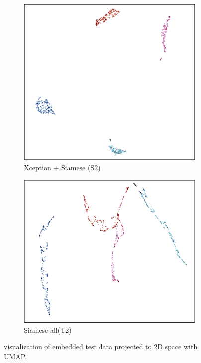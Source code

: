 \begin{figure}[h]
  \centering
  \begin{subfigure}[b]{0.48\linewidth}
   \includegraphics[width=0.9\linewidth]{figs/umab_visualS2.png}
   \caption{Xception + Siamese (S2)}
   \label{fig:tri_loss}
  \end{subfigure}
  \hfill
   \begin{subfigure}[b]{0.48\linewidth}
  \includegraphics[width=\linewidth]{figs/umab_visualT2.png}
  \caption{Siamese all(T2)}
  \label{fig:con_loss}
  \end{subfigure}
    \hfill
    \caption{visualization of embedded test data projected to 2D space with UMAP.}
    \label{fig:2Dprojection}
\end{figure}

